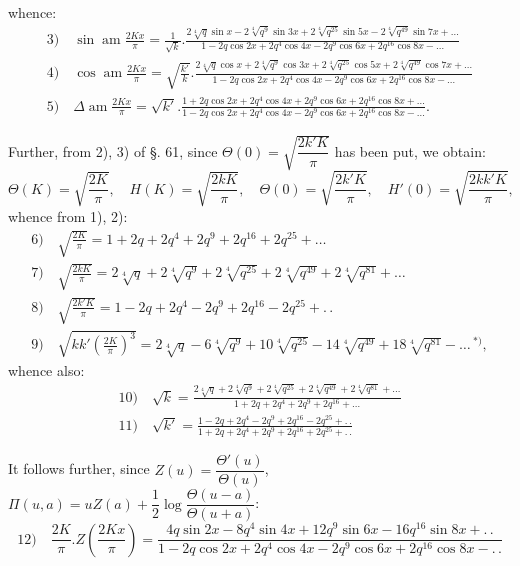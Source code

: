\documentclass{article}
\begin{document}
whence:
\[
\begin{gathered}
\text{3)}\quad\sin\operatorname{am}\frac{2Kx}{\pi}=\frac{1}{\sqrt{k}}.\frac{2\sqrt[4]{q}\sin x-2\sqrt[4]{q^{9}}\sin 3x+2\sqrt[4]{q^{25}}\sin 5x-2\sqrt[4]{q^{49}}\sin 7x+\ldots}{1-2q\cos 2x+2q^{4}\cos 4x-2q^{9}\cos 6x+2q^{16}\cos 8x-\ldots}\\[2ex]
\text{4)}\quad\cos\operatorname{am}\frac{2Kx}{\pi}=\sqrt{\frac{k'}{k}}.\frac{2\sqrt[4]{q}\cos x+2\sqrt[4]{q^{9}}\cos 3x+2\sqrt[4]{q^{25}}\cos 5x+2\sqrt[4]{q^{49}}\cos 7x+\ldots}{1-2q\cos 2x+2q^{4}\cos 4x-2q^{9}\cos 6x+2q^{16}\cos 8x-\ldots}\\[2ex]
\text{5)}\quad\Delta\operatorname{am}\frac{2Kx}{\pi}=\sqrt{k'}.\frac{1+2q\cos 2x+2q^{4}\cos 4x+2q^{9}\cos 6x+2q^{16}\cos 8x+\ldots}{1-2q\cos 2x+2q^{4}\cos 4x-2q^{9}\cos 6x+2q^{16}\cos 8x-\ldots}.
\end{gathered}
\]

Further, from 2), 3) of §. 61, since $\Theta(0)=\sqrt{\dfrac{2k'K}{\pi}}$ has been put, we obtain:
\[
\Theta(K)=\sqrt{\frac{2K}{\pi}},\quad H(K)=\sqrt{\frac{2kK}{\pi}},\quad\Theta(0)=\sqrt{\frac{2k'K}{\pi}},\quad H'(0)=\sqrt{\frac{2kk'K}{\pi}},
\]
whence from 1), 2):
\[
\begin{gathered}
\text{6)}\quad\sqrt{\frac{2K}{\pi}}=1+2q+2q^{4}+2q^{9}+2q^{16}+2q^{25}+\ldots\\[2ex]
\text{7)}\quad\sqrt{\frac{2kK}{\pi}}=2\sqrt[4]{q}+2\sqrt[4]{q^{9}}+2\sqrt[4]{q^{25}}+2\sqrt[4]{q^{49}}+2\sqrt[4]{q^{81}}+\ldots\\[2ex]
\text{8)}\quad\sqrt{\frac{2k'K}{\pi}}=1-2q+2q^{4}-2q^{9}+2q^{16}-2q^{25}+.\,.\\[2ex]
\text{9)}\quad\sqrt{kk'\left(\frac{2K}{\pi}\right)^{3}}=2\sqrt[4]{q}-6\sqrt[4]{q^{9}}+10\sqrt[4]{q^{25}}-14\sqrt[4]{q^{49}}+18\sqrt[4]{q^{81}}-\ldots\,{}^{*)},
\end{gathered}
\]
whence also:
\[
\begin{gathered}
\text{10)}\quad\sqrt{k}=\frac{2\sqrt[4]{q}+2\sqrt[4]{q^{9}}+2\sqrt[4]{q^{25}}+2\sqrt[4]{q^{49}}+2\sqrt[4]{q^{81}}+\ldots}{1+2q+2q^{4}+2q^{9}+2q^{16}+\ldots}\\[2ex]
\text{11)}\quad\sqrt{k'}=\frac{1-2q+2q^{4}-2q^{9}+2q^{16}-2q^{25}+.\,.}{1+2q+2q^{4}+2q^{9}+2q^{16}+2q^{25}+.\,.}
\end{gathered}
\]

It follows further, since $Z(u)=\dfrac{\Theta'(u)}{\Theta(u)}$, $\Pi(u,a)=uZ(a)+\dfrac{1}{2}\log\dfrac{\Theta(u-a)}{\Theta(u+a)}$:
\[
\text{12)}\quad\frac{2K}{\pi}.Z\left(\frac{2Kx}{\pi}\right)=\frac{4q\sin 2x-8q^{4}\sin 4x+12q^{9}\sin 6x-16q^{16}\sin 8x+.\,.}{1-2q\cos 2x+2q^{4}\cos 4x-2q^{9}\cos 6x+2q^{16}\cos 8x-.\,.}
\]
\end{document}
